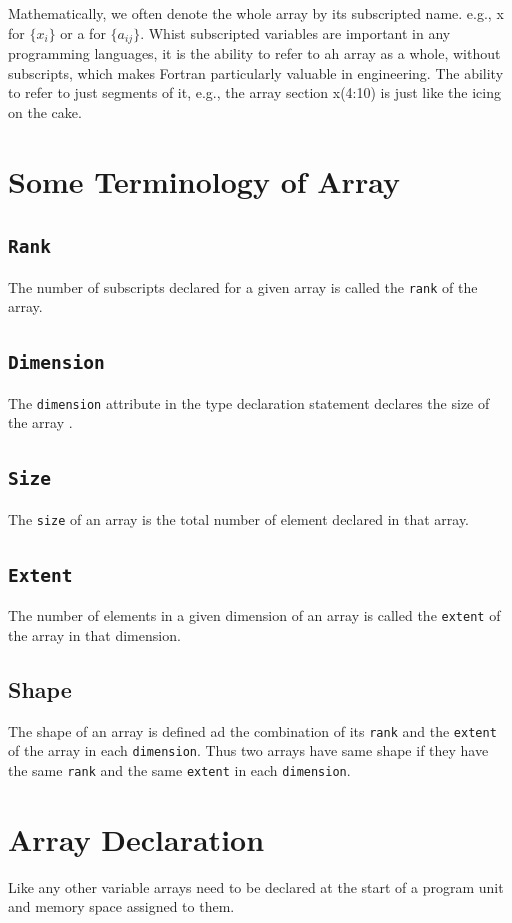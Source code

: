 \documentclass[12pt,oneside]{book}
\newcommand{\code}[1]{\lstinline[keywordstyle=\color{black},basicstyle=\ttfamily]{#1}}
\begin{document}
    Mathematically, we often denote the whole array by its subscripted name. e.g., x for $ \{x_i\} $ or a for $ \{a_{ij}\} $. Whist subscripted variables are important in any programming languages, it is the ability to refer to ah array as a whole, without subscripts, which makes Fortran particularly valuable in engineering. The ability to refer to just segments of it, e.g., the array section x(4:10) is just like the icing on the cake.
    \section{Some Terminology of Array}
    \subsection{\code{Rank}}
    The number of subscripts declared for a given array is called the \code{rank} of the array.
    \subsection{\code{Dimension}}
    The \code{dimension} attribute in the type declaration statement declares the size of the array .
    \subsection{\code{Size}}
    The \code{size} of an array is the total number of element declared in that array.
    \subsection{\code{Extent}}
    The number of elements in a given dimension of an array is called the \code{extent} of the array in that dimension.
    \subsection{Shape}
    The shape of an array is defined ad the combination of its \code{rank} and the \code{extent} of the array in each \code{dimension}. Thus two arrays have same shape if they have the same \code{rank} and the same \code{extent} in each \code{dimension}.
    \section{Array Declaration}
    Like any other variable arrays need to be declared at the start of a program unit and memory space assigned to them.
\end{document}
